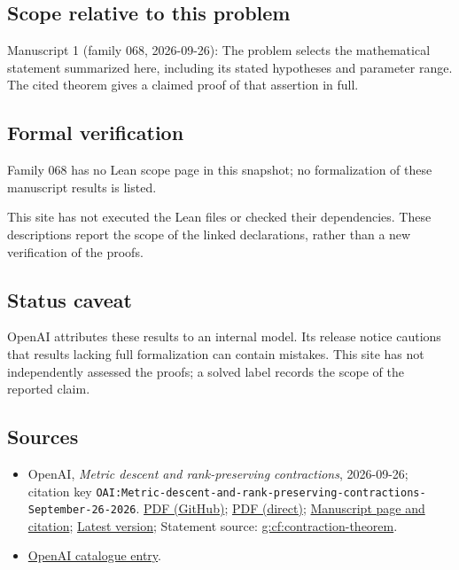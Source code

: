 \documentclass[11pt]{article}
\begin{document}
\subsection{Scope relative to this problem}
Manuscript 1 (family 068, 2026-09-26): The problem selects the mathematical statement summarized here, including its stated hypotheses and parameter range. The cited theorem gives a claimed proof of that assertion in full.

\subsection{Formal verification}
Family 068 has no Lean scope page in this snapshot; no formalization of these manuscript results is listed.

This site has not executed the Lean files or checked their dependencies. These descriptions report the scope of the linked declarations, rather than a new verification of the proofs.

\subsection{Status caveat}
OpenAI attributes these results to an internal model. Its release notice cautions that results lacking full formalization can contain mistakes. This site has not independently assessed the proofs; a solved label records the scope of the reported claim.

\subsection{Sources}
\begin{itemize}
\item OpenAI, \emph{Metric descent and rank-preserving contractions}, 2026-09-26; citation key \texttt{OAI:Metric-descent-and-rank-preserving-contractions-September-26-2026}. \href{https://github.com/openai/math/blob/adc7f1241b42e322a6451854ab7e4b4c146bf78a/preprints/Metric-descent-and-rank-preserving-contractions-September-26-2026/main.pdf}{PDF (GitHub)}; \href{https://github.com/openai/math/raw/adc7f1241b42e322a6451854ab7e4b4c146bf78a/preprints/Metric-descent-and-rank-preserving-contractions-September-26-2026/main.pdf}{PDF (direct)}; \href{https://github.com/openai/math/blob/adc7f1241b42e322a6451854ab7e4b4c146bf78a/preprints/Metric-descent-and-rank-preserving-contractions-September-26-2026/README.md}{Manuscript page and citation}; \href{https://github.com/openai/math/blob/main/preprints/Metric-descent-and-rank-preserving-contractions-September-26-2026/main.pdf}{Latest version}; Statement source: \href{https://github.com/openai/math/blob/adc7f1241b42e322a6451854ab7e4b4c146bf78a/preprints/Metric-descent-and-rank-preserving-contractions-September-26-2026/build/source/sections/contraction.tex\#L13}{g:cf:contraction-theorem}.
\item \href{https://github.com/openai/math/blob/adc7f1241b42e322a6451854ab7e4b4c146bf78a/CONTENTS.md}{OpenAI catalogue entry}.
\end{itemize}
\end{document}
